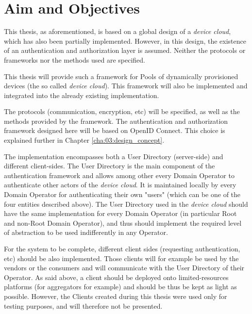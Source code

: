 




\section{Aim and Objectives}
This thesis, as aforementioned, is based on a global design of a \emph{device cloud}, which has also been partially implemented. However, in this design, the existence of an authentication and authorization layer is assumed. Neither the protocols or frameworks nor the methods used are specified.

This thesis will provide such a framework for Pools of dynamically provisioned devices (the so called \emph{device cloud}). This framework will also be implemented and integrated into the already existing implementation.

The protocols (communication, encryption, etc) will be specified, as well as the methods provided by the framework. The authentication and authorization framework designed here will be based on OpenID Connect. This choice is explained further in Chapter \ref{cha:03:design_concept}. 

The implementation encompasses both a User Directory (server-side) and different client-sides. The User Directory is the main component of the authentication framework and allows among other every Domain Operator to authenticate other actors of the \emph{device cloud}. It is maintained locally by every Domain Operator for authenticating their own "users" (which can be one of the four entities described above). The User Directory used in the \emph{device cloud} should have the same implementation for every Domain Operator (in particular Root and non-Root Domain Operator), and thus should implement the required level of abstraction to be used indifferently in any Operator.

For the system to be complete, different client sides (requesting authentication, etc) should be also implemented. Those clients will for example be used by the vendors or the consumers and will communicate with the User Directory of their Operator. As said above, a client should be deployed onto limited-resources platforms (for aggregators for example) and should be thus be kept as light as possible. However, the Clients created during this thesis were used only for testing purposes, and will therefore not be presented. 

